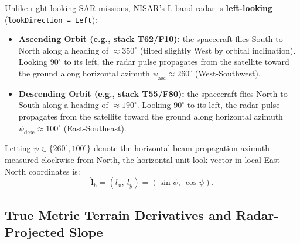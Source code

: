 \documentclass[11pt,a4paper]{article}
\begin{document}
Unlike right-looking SAR missions, NISAR's L-band radar is \textbf{left-looking} (\texttt{lookDirection = Left}):
\begin{itemize}
  \item \textbf{Ascending Orbit (e.g., stack T62/F10):} the spacecraft flies South-to-North along a heading of $\approx 350^\circ$ (tilted slightly West by orbital inclination). Looking $90^\circ$ to its left, the radar pulse propagates from the satellite toward the ground along horizontal azimuth $\psi_{\mathrm{asc}} \approx 260^\circ$ (West-Southwest).
  \item \textbf{Descending Orbit (e.g., stack T55/F80):} the spacecraft flies North-to-South along a heading of $\approx 190^\circ$. Looking $90^\circ$ to its left, the radar pulse propagates from the satellite toward the ground along horizontal azimuth $\psi_{\mathrm{desc}} \approx 100^\circ$ (East-Southeast).
\end{itemize}

Letting $\psi \in \{260^\circ, 100^\circ\}$ denote the horizontal beam propagation azimuth measured clockwise from North, the horizontal unit look vector in local East--North coordinates is:
\begin{equation}
  \hat{\mathbf{l}}_{\mathrm{h}} = (l_x,\ l_y) = \left(\sin\psi,\ \cos\psi\right).
  \label{eq:vector-haz-sar}
\end{equation}

\subsection{True Metric Terrain Derivatives and Radar-Projected Slope}
\label{sec:relieve3d-ecuaciones-sar}
\end{document}
